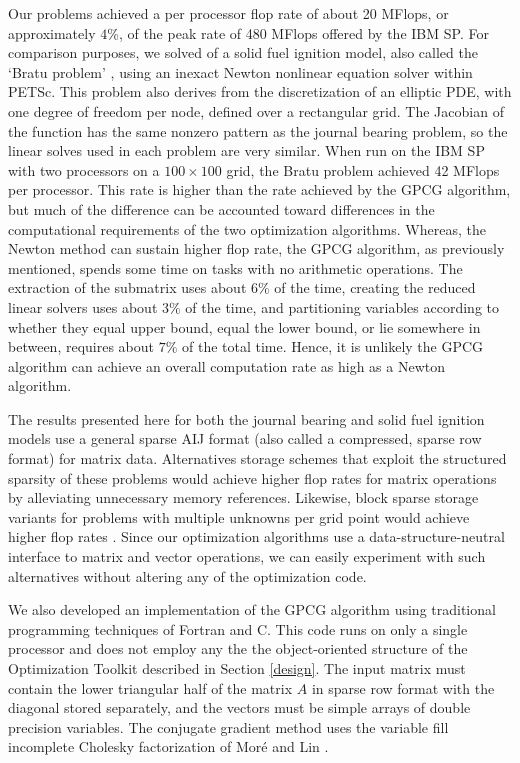 Our problems achieved a per processor
flop rate of about 20 MFlops, or approximately $4\%$, of the peak rate
of 480 MFlops offered by the IBM SP.  For comparison purposes, we
solved of a solid fuel ignition model, also called
the `Bratu problem' \cite{minpack2},
using an inexact Newton nonlinear equation solver within PETSc.
This problem also derives from the discretization of an elliptic
PDE, with one degree of freedom per node, defined
over a rectangular grid.
The Jacobian of the function has the same nonzero pattern
as the journal bearing problem, so the linear solves used in each
problem are very similar.
When run on the IBM SP with two processors on a $100 \times 100$ grid,
the Bratu problem achieved 42 MFlops per processor.
This rate is higher than the rate achieved by the GPCG algorithm,
but much of the difference can be accounted toward differences in
the computational requirements of the two optimization algorithms.
Whereas, the Newton method can sustain higher flop rate, the
GPCG algorithm, as previously mentioned, spends some time on tasks
with no arithmetic operations.  The extraction of the submatrix
uses about $6\%$ of the time, creating the reduced linear
solvers uses about $3\%$ of the time, and partitioning variables
according to whether they equal upper bound, equal the lower bound,
or lie somewhere in between, requires about $7\%$ of the
total time.  Hence, it is unlikely the GPCG algorithm can
achieve an overall computation rate as high as a Newton algorithm.

The results presented here for both the journal bearing and solid fuel
ignition models use a general sparse AIJ format (also called a
compressed, sparse row format) for matrix data.  Alternatives storage
schemes that exploit the structured sparsity of these problems would
achieve higher flop rates for matrix operations by alleviating
unnecessary memory references.  Likewise, block sparse storage
variants for problems with multiple unknowns per grid point would
achieve higher flop rates \cite{gkmt98}.  Since our optimization
algorithms use a data-structure-neutral interface to matrix and vector
operations, we can easily experiment with such alternatives without
altering any of the optimization code.

We also developed an implementation of the GPCG algorithm
using traditional programming techniques of Fortran and C.
This code runs on only a single processor and does not employ
any the the object-oriented structure of the Optimization Toolkit
described in Section \ref{design}.  The input matrix must contain the
lower triangular half of the matrix $A$ in sparse row format
with the diagonal stored separately, and the
vectors must be simple arrays of double precision variables.
The conjugate gradient method uses the variable fill
incomplete Cholesky factorization of Mor\'e and Lin \cite{CJL99a}.

